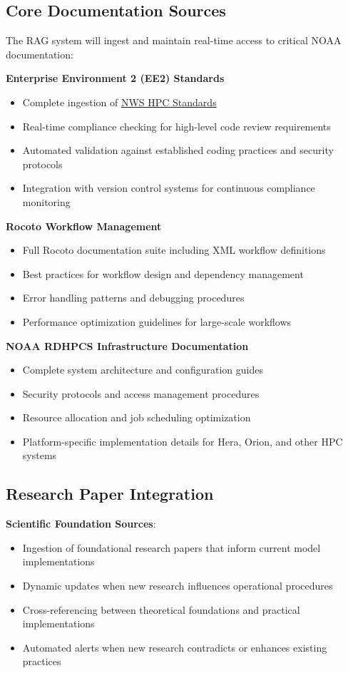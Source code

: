 \documentclass[11pt,letterpaper]{article}
\begin{document}
\subsection{Core Documentation Sources}
The RAG system will ingest and maintain real-time access to critical NOAA documentation:

\begin{center}
\end{center}

\textbf{Enterprise Environment 2 (EE2) Standards}
\begin{itemize}
    \item Complete ingestion of \href{https://nws-hpc-standards.readthedocs.io/en/latest/standards.html}{NWS HPC Standards}
    \item Real-time compliance checking for high-level code review requirements
    \item Automated validation against established coding practices and security protocols
    \item Integration with version control systems for continuous compliance monitoring
\end{itemize}

\textbf{Rocoto Workflow Management}
\begin{itemize}
    \item Full Rocoto documentation suite including XML workflow definitions
    \item Best practices for workflow design and dependency management
    \item Error handling patterns and debugging procedures
    \item Performance optimization guidelines for large-scale workflows
\end{itemize}

\textbf{NOAA RDHPCS Infrastructure Documentation}
\begin{itemize}
    \item Complete system architecture and configuration guides
    \item Security protocols and access management procedures
    \item Resource allocation and job scheduling optimization
    \item Platform-specific implementation details for Hera, Orion, and other HPC systems
\end{itemize}

\subsection{Research Paper Integration}
\textbf{Scientific Foundation Sources}:
\begin{itemize}
    \item Ingestion of foundational research papers that inform current model implementations
    \item Dynamic updates when new research influences operational procedures
    \item Cross-referencing between theoretical foundations and practical implementations
    \item Automated alerts when new research contradicts or enhances existing practices
\end{itemize}
\end{document}
